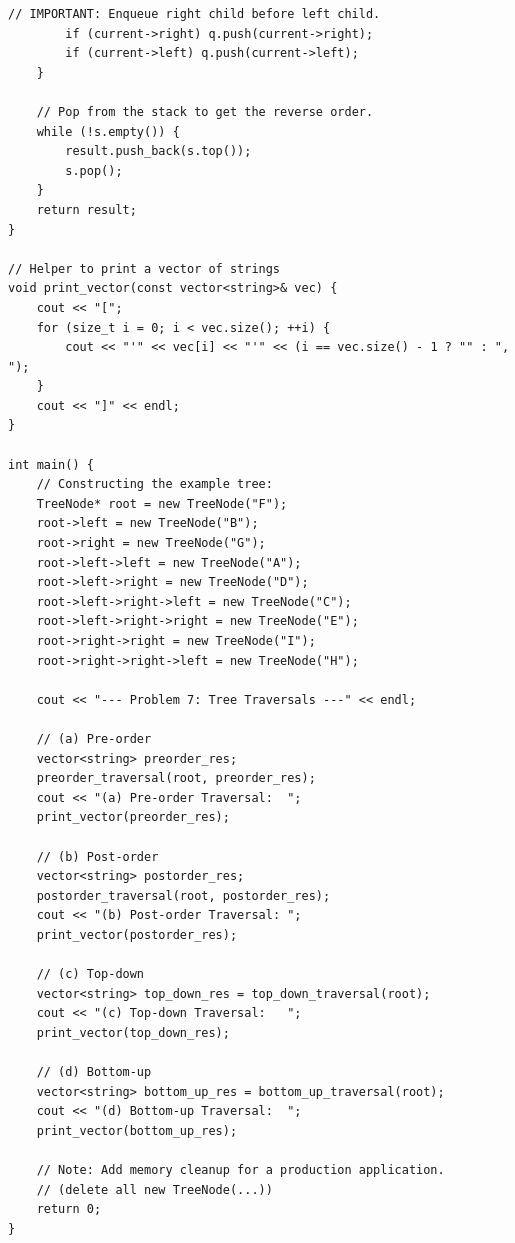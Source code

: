 \documentclass[a4paper,12pt]{article}
\begin{document}
\begin{lstlisting}[style=cppstyle, caption={Các thuật toán duyệt cây nhị phân trong C++.}, label={lst:cpp_tree_traversal}]
        // IMPORTANT: Enqueue right child before left child.
        if (current->right) q.push(current->right);
        if (current->left) q.push(current->left);
    }
    
    // Pop from the stack to get the reverse order.
    while (!s.empty()) {
        result.push_back(s.top());
        s.pop();
    }
    return result;
}

// Helper to print a vector of strings
void print_vector(const vector<string>& vec) {
    cout << "[";
    for (size_t i = 0; i < vec.size(); ++i) {
        cout << "'" << vec[i] << "'" << (i == vec.size() - 1 ? "" : ", ");
    }
    cout << "]" << endl;
}

int main() {
    // Constructing the example tree:
    TreeNode* root = new TreeNode("F");
    root->left = new TreeNode("B");
    root->right = new TreeNode("G");
    root->left->left = new TreeNode("A");
    root->left->right = new TreeNode("D");
    root->left->right->left = new TreeNode("C");
    root->left->right->right = new TreeNode("E");
    root->right->right = new TreeNode("I");
    root->right->right->left = new TreeNode("H");

    cout << "--- Problem 7: Tree Traversals ---" << endl;

    // (a) Pre-order
    vector<string> preorder_res;
    preorder_traversal(root, preorder_res);
    cout << "(a) Pre-order Traversal:  ";
    print_vector(preorder_res);

    // (b) Post-order
    vector<string> postorder_res;
    postorder_traversal(root, postorder_res);
    cout << "(b) Post-order Traversal: ";
    print_vector(postorder_res);

    // (c) Top-down
    vector<string> top_down_res = top_down_traversal(root);
    cout << "(c) Top-down Traversal:   ";
    print_vector(top_down_res);

    // (d) Bottom-up
    vector<string> bottom_up_res = bottom_up_traversal(root);
    cout << "(d) Bottom-up Traversal:  ";
    print_vector(bottom_up_res);

    // Note: Add memory cleanup for a production application.
    // (delete all new TreeNode(...))
    return 0;
}
\end{lstlisting}
\end{document}

